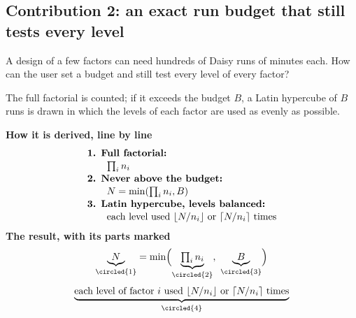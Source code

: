 \subsection{Contribution 2: an exact run budget that still tests every level}
\begin{problem}
A design of a few factors can need hundreds of Daisy runs of minutes each. How can the user set a budget and still test every level of every factor?
\end{problem}
\begin{derivation}
The full factorial is counted; if it exceeds the budget $B$, a Latin hypercube of $B$ runs is drawn in which the levels of each factor are used as evenly as possible.
\end{derivation}
\begin{keyresult}
\begin{pencil}
{\small\noindent\textbf{How it is derived, line by line}
\[\begin{array}{@{}l@{}}\textbf{1. Full factorial:}\\[1pt]
\qquad \textstyle\prod_in_i\\[1pt]
\textbf{2. Never above the budget:}\\[1pt]
\qquad N=\min(\prod_in_i,B)\\[1pt]
\textbf{3. Latin hypercube, levels balanced:}\\[1pt]
\qquad \text{each level used }\lfloor N/n_i\rfloor\text{ or }\lceil N/n_i\rceil\text{ times}
\end{array}\]}
\noindent\textbf{The result, with its parts marked}
\[\underbrace{N}_{\circled{1}}=\min\Bigl(\underbrace{\textstyle\prod_i n_i}_{\circled{2}},\ \underbrace{B}_{\circled{3}}\Bigr)\]
\[\underbrace{\text{each level of factor } i \text{ used } \lfloor N/n_i\rfloor \text{ or } \lceil N/n_i\rceil \text{ times}}_{\circled{4}}\]
\end{pencil}
\end{keyresult}
\begin{pins}
\end{pins}


